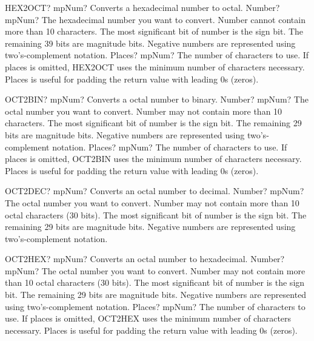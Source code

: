 \documentclass[12pt,a4paper,openany]{book}
\begin{document}
\begin{mpFunctionsExtract}
\mpWorksheetFunctionTwoNotImplemented
{HEX2OCT? mpNum? Converts a hexadecimal number to octal.}
{Number? mpNum? The hexadecimal number you want to convert. Number cannot contain more than 10 characters. The most significant bit of number is the sign bit. The remaining 39 bits are magnitude bits. Negative numbers are represented using two's-complement notation.}
{Places? mpNum? The number of characters to use. If places is omitted, HEX2OCT uses the minimum number of characters necessary. Places is useful for padding the return value with leading 0s (zeros).}
\end{mpFunctionsExtract}

\begin{mpFunctionsExtract}
\mpWorksheetFunctionTwoNotImplemented
{OCT2BIN? mpNum? Converts a octal number to binary.}
{Number? mpNum? The octal number you want to convert. Number may not contain more than 10 characters. The most significant bit of number is the sign bit. The remaining 29 bits are magnitude bits. Negative numbers are represented using two's-complement notation.}
{Places? mpNum? The number of characters to use. If places is omitted, OCT2BIN uses the minimum number of characters necessary. Places is useful for padding the return value with leading 0s (zeros).}
\end{mpFunctionsExtract}

\begin{mpFunctionsExtract}
\mpWorksheetFunctionOneNotImplemented
{OCT2DEC? mpNum? Converts an octal number to decimal.}
{Number? mpNum? The octal number you want to convert. Number may not contain more than 10 octal characters (30 bits). The most significant bit of number is the sign bit. The remaining 29 bits are magnitude bits. Negative numbers are represented using two's-complement notation.}
\end{mpFunctionsExtract}

\begin{mpFunctionsExtract}
\mpWorksheetFunctionTwoNotImplemented
{OCT2HEX? mpNum? Converts an octal number to hexadecimal.}
{Number? mpNum? The octal number you want to convert. Number may not contain more than 10 octal characters (30 bits). The most significant bit of number is the sign bit. The remaining 29 bits are magnitude bits. Negative numbers are represented using two's-complement notation.}
{Places? mpNum? The number of characters to use. If places is omitted, OCT2HEX uses the minimum number of characters necessary. Places is useful for padding the return value with leading 0s (zeros).}
\end{mpFunctionsExtract}
\end{document}
